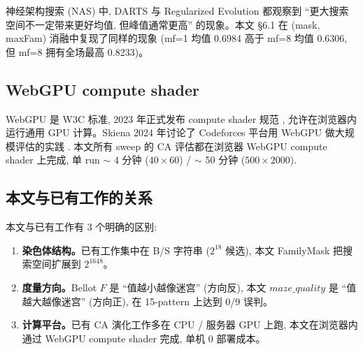 神经架构搜索 (NAS) 中, DARTS \cite{liu2018darts} 与 Regularized Evolution \cite{real2019regularized} 都观察到 ``更大搜索空间不一定带来更好均值, 但峰值通常更高'' 的现象。本文 §6.1 在 (mask, maxFam) 消融中复现了同样的现象 (mf=1 均值 0.6984 高于 mf=8 均值 0.6306, 但 mf=8 拥有全场最高 0.8233)。

\subsection{WebGPU compute shader}

WebGPU 是 W3C 标准, 2023 年正式发布 compute shader 规范 \cite{webgpu2023}, 允许在浏览器内运行通用 GPU 计算。Skiena 2024 年讨论了 Codeforces 平台用 WebGPU 做大规模评估的实践 \cite{skiena2024}. 本文所有 sweep 的 CA 评估都在浏览器 WebGPU compute shader 上完成, 单 run $\sim$ 4 分钟 ($40 \times 60$) / $\sim$ 50 分钟 ($500 \times 2000$).

\subsection{本文与已有工作的关系}

本文与已有工作有 3 个明确的区别:
\begin{enumerate}[leftmargin=*, itemsep=0pt, topsep=0pt]
  \item \textbf{染色体结构。}已有工作集中在 B/S 字符串 ($2^{18}$ 候选), 本文 FamilyMask 把搜索空间扩展到 $2^{1648}$。
  \item \textbf{度量方向。}Bellot $F$ 是 ``值越小越像迷宫'' (方向反), 本文 $maze\_quality$ 是 ``值越大越像迷宫'' (方向正), 在 15-pattern 上达到 0/9 误判。
  \item \textbf{计算平台。}已有 CA 演化工作多在 CPU / 服务器 GPU 上跑, 本文在浏览器内通过 WebGPU compute shader 完成, 单机 0 部署成本。
\end{enumerate}
